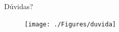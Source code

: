 \documentclass{beamer}
\begin{document}
\begin{frame}{Dúvidas?}
  \begin{figure}[h]
  	\begin{center}
      \texttt{[image: ./Figures/duvida]}
  	\end{center}
  \end{figure}
\end{frame}

\end{document}

